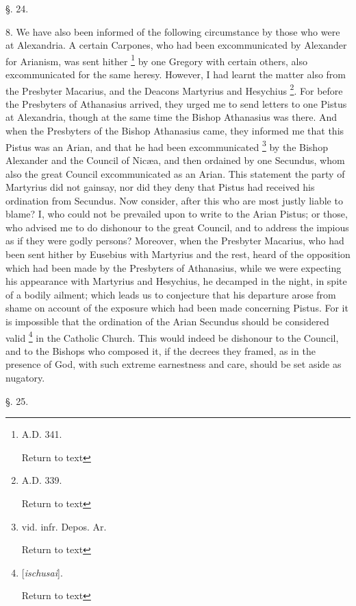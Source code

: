 §. 24.

8. We have also been informed of the following
circumstance by those who were at Alexandria. A certain Carpones, who
had been excommunicated by Alexander for Arianism, was sent hither \footnote{A.D.
341.

Return to text} by one Gregory with certain others, also excommunicated for
the same heresy. However, I had learnt the matter also from the
Presbyter Macarius, and the Deacons Martyrius and Hesychius \footnote{A.D.
339.

Return to text}. For before the Presbyters of Athanasius arrived, they urged
me to send letters to one Pistus at Alexandria, though at the same
time the Bishop Athanasius was there. And when the Presbyters of the
Bishop Athanasius came, they informed me that this Pistus was an
Arian, and that he had been excommunicated \footnote{vid. infr. Depos. Ar.

Return to text} by the Bishop Alexander and the Council of Nicæa, and then
ordained by one Secundus, whom also the great Council excommunicated
as an Arian. This statement the party of Martyrius did not gainsay,
nor did they deny that Pistus had received his ordination from
Secundus. Now consider, after this who are most justly liable to
blame? I, who could not be prevailed upon to write to the Arian Pistus;
or those, who advised me to do dishonour to the great Council, and to
address the impious as if they were godly persons? Moreover, when the
Presbyter Macarius, who had been sent hither by Eusebius with
Martyrius and the rest, heard of the opposition which had been made by
the Presbyters of Athanasius, while we were expecting his appearance
with Martyrius and Hesychius, he decamped in the night, in spite of a
bodily ailment; which leads us to conjecture that his departure arose
from shame on account of the exposure which had been made concerning
Pistus. For it is impossible that the ordination of the Arian Secundus
should be considered valid \footnote{[\emph{ischusai}].

Return to text} in the Catholic Church. This would indeed be dishonour to the
Council, and to the Bishops who composed it, if the decrees they
framed, as in the presence of God, with such extreme earnestness and
care, should be set aside as nugatory.

§. 25.


